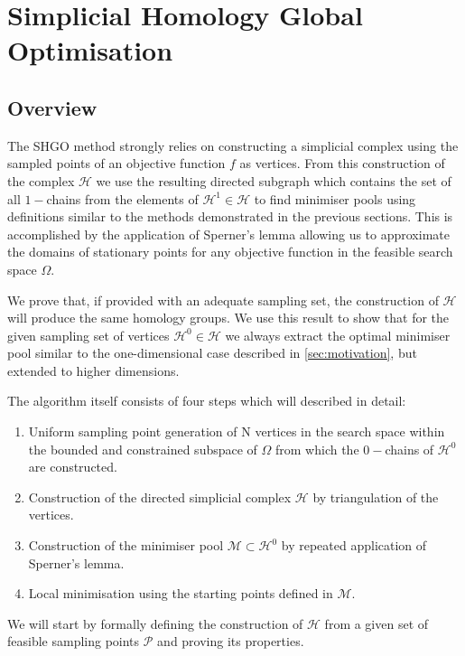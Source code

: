 \chapter{Simplicial Homology Global Optimisation}  \label{sec:shgo}
\section{Overview}
The SHGO method strongly relies on constructing a simplicial complex using the sampled points of an objective function $f$ as vertices. From this construction of the complex $\mathcal{H}$ we use the resulting directed subgraph which contains the set of all $1-$chains from the elements of $\mathcal{H}^1 \in \mathcal{H}$ to find minimiser pools using definitions similar to the methods demonstrated in the previous sections. This is accomplished by the application of Sperner's lemma \cite{Sperner1928} allowing us to approximate the domains of stationary points for any objective function in the feasible search space $\Omega$. 

We prove that, if provided with an adequate sampling set, the construction of $\mathcal{H}$ will produce the same homology groups. We use this result to show that for the given sampling set of vertices $\mathcal{H}^0 \in \mathcal{H}$ we always extract the optimal minimiser pool similar to the one-dimensional case described in \autoref{sec:motivation}, but extended to higher dimensions. 

The algorithm itself consists of four steps which will described in detail:
\begin{enumerate}
\item Uniform sampling point generation of N vertices in the search space within the bounded and constrained subspace of $\Omega$ from which the $0-$chains of $\mathcal{H}^0$ are constructed.
\item Construction of the directed simplicial complex $\mathcal{H}$ by triangulation of the vertices.
\item Construction of the minimiser pool $\mathcal{M} \subset \mathcal{H}^0$ by repeated application of Sperner's lemma.%
\item Local minimisation using the starting points defined in $\mathcal{M}$.
\end{enumerate}

We will start by formally defining the construction of $\mathcal{H}$ from a given set of feasible sampling points $\mathcal{P}$ and proving its properties. %


